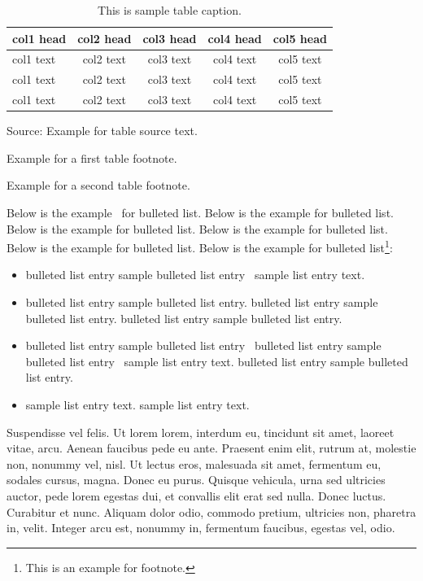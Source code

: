 \documentclass[APA,STIX1COL]{WileyNJD-v2}
\begin{document}
\begin{center}
\begin{table}[t]%
\centering
\caption{This is sample table caption.\label{tab2}}%
\begin{tabular*}{500pt}{@{\extracolsep\fill}lcccc@{\extracolsep\fill}}
\toprule
\textbf{col1 head} & \textbf{col2 head}  & \textbf{col3 head}  & \textbf{col4 head}  & \textbf{col5 head} \\
\midrule
col1 text & col2 text  & col3 text  & col4 text  & col5 text\tnote{$\dagger$}   \\
col1 text & col2 text  & col3 text  & col4 text  & col5 text   \\
col1 text & col2 text  & col3 text  & col4 text  & col5 text\tnote{$\ddagger$}   \\
\bottomrule
\end{tabular*}
\begin{tablenotes}
\item Source: Example for table source text.
\item[$\dagger$] Example for a first table footnote.
\item[$\ddagger$] Example for a second table footnote.
\end{tablenotes}
\end{table}
\end{center}



Below is the example~\cite{Rothermel1998,Yoo2007,Schulz2012} for bulleted list. Below is the example for bulleted list. Below is the example for bulleted list. Below is the example for bulleted list. Below is the example for bulleted list. Below is the example for bulleted list\footnote{This is an example for footnote.}:
\begin{itemize}
\item bulleted list entry sample bulleted list entry~\cite{Allen2011} sample list entry text. 
\item bulleted list entry sample bulleted list entry. bulleted list entry sample bulleted list entry. bulleted list entry sample bulleted list entry.
\item bulleted list entry sample bulleted list entry~\cite{Ballen2011} bulleted list entry sample bulleted list entry~\citet{Allen2011} sample list entry text.  bulleted list entry sample bulleted list entry.
\item sample list entry text. sample list entry text.  
\end{itemize}

Suspendisse vel felis. Ut lorem lorem, interdum eu, tincidunt sit amet, laoreet vitae, arcu. Aenean faucibus pede eu
ante. Praesent enim elit, rutrum at, molestie non, nonummy vel, nisl. Ut lectus eros, malesuada sit amet, fermentum
eu, sodales cursus, magna. Donec eu purus. Quisque vehicula, urna sed ultricies auctor, pede lorem egestas dui, et
convallis elit erat sed nulla. Donec luctus. Curabitur et nunc. Aliquam dolor odio, commodo pretium, ultricies non,
pharetra in, velit. Integer arcu est, nonummy in, fermentum faucibus, egestas vel, odio.
\end{document}

